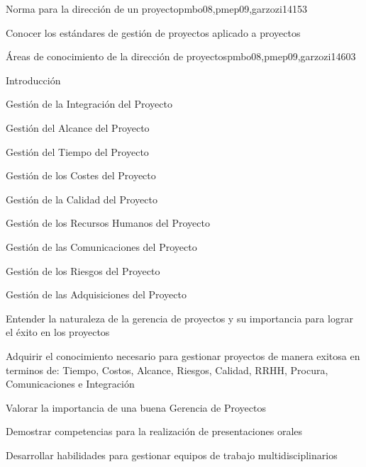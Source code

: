 \begin{syllabus}
\begin{unit}{Norma para la dirección de un proyecto}{}{pmbo08,pmep09,garzozi14}{15}{3}
\begin{learningoutcomes}
      \item Conocer los estándares de gestión de proyectos aplicado a proyectos
\end{learningoutcomes}
\end{unit}

\begin{unit}{Áreas de conocimiento de la dirección de proyectos}{}{pmbo08,pmep09,garzozi14}{60}{3}
\begin{topics}
      \item Introducción
      \item Gestión de la Integración del Proyecto
      \item Gestión del Alcance del Proyecto
      \item Gestión del Tiempo del Proyecto
      \item Gestión de los Costes del Proyecto
      \item Gestión de la Calidad del Proyecto
      \item Gestión de los Recursos Humanos del Proyecto
      \item Gestión de las Comunicaciones del Proyecto
      \item Gestión de los Riesgos del Proyecto
      \item Gestión de las Adquisiciones del Proyecto
\end{topics}

\begin{learningoutcomes}
      \item Entender la naturaleza de la gerencia de proyectos y su importancia para lograr el éxito en los proyectos
      \item Adquirir el conocimiento necesario para gestionar proyectos de manera exitosa en terminos de: Tiempo, Costos, Alcance, Riesgos, Calidad, RRHH, Procura, Comunicaciones e Integración
      \item Valorar la importancia de una buena Gerencia de Proyectos
      \item Demostrar competencias para la realización de presentaciones orales
      \item Desarrollar habilidades para gestionar equipos de trabajo multidisciplinarios
\end{learningoutcomes}
\end{unit}

\begin{coursebibliography}
\end{coursebibliography}

\end{syllabus}
   